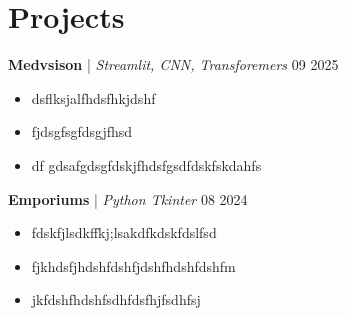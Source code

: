 \documentclass[letterpaper,11pt]{article}
\begin{document}
\section*{Projects}
\textbf{Medvsison } \href{lkejfkjdsjkfdjsf}{\faExternalLink} | \textit{Streamlit, CNN, Transforemers} \hfill 09 2025 \\[2pt]
\begin{itemize}[leftmargin=*]
\item dsflksjalfhdsfhkjdshf
\item fjdsgfsgfdsgjfhsd
\item df gdsafgdsgfdskjfhdsfgsdfdskfskdahfs
\end{itemize}

\textbf{Emporiums} \href{sfsdfdsfsdfdsf}{\faExternalLink} | \textit{Python Tkinter} \hfill 08 2024 \\[2pt]
\begin{itemize}[leftmargin=*]
\item fdskfjlsdkffkj;lsakdfkdskfdslfsd
\item fjkhdsfjhdshfdshfjdshfhdshfdshfm
\item jkfdshfhdshfsdhfdsfhjfsdhfsj
\end{itemize}
\end{document}
